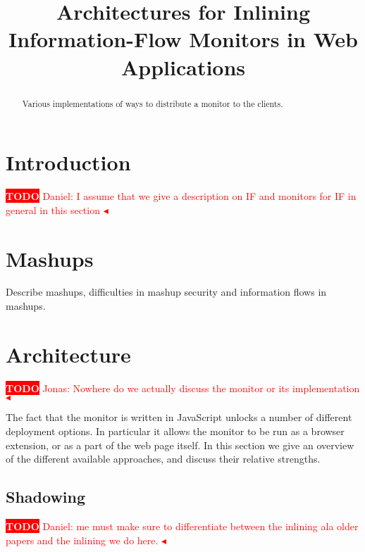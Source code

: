 \documentclass{llncs}
\title{Architectures for Inlining Information-Flow Monitors in Web Applications}
\newcommand{\todo}[1]{\colorbox{red}{\textcolor{white}{\sffamily\bfseries\scriptsize TODO}} \textcolor{red}{#1} \textcolor{red}{$\blacktriangleleft$}}
\begin{document}
\maketitle



\begin{abstract}
Various implementations of ways to distribute a monitor to the clients.
\end{abstract}










\section{Introduction}
\label{sec:intro}

\todo{Daniel: I assume that we give a description on IF and monitors for IF in general in this section}

\section{Mashups}
\label{sec:mash}

Describe mashups, difficulties in mashup security and information flows in mashups.

\section{Architecture}
\label{sec:arch}

\todo{Jonas: Nowhere do we actually discuss the monitor or its implementation}

The fact that the monitor is written in JavaScript unlocks a number of
different deployment options. In particular it allows the monitor to be run as
a browser extension, or as a part of the web page itself.  In this section we
give an overview of the different available approaches, and discuss their
relative strengths.


\subsection{Shadowing}
\todo{Daniel: me must make sure to differentiate between the inlining ala older papers and the inlining we do here.}
\end{document}
